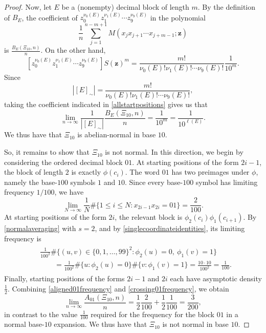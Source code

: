 \documentclass[10pt,a4paper]{amsart}
\begin{document}
\begin{proof}
 Now, let $E$ be a (nonempty) decimal block of length $m$.   By the definition of $B_E$, the coefficient of     $z_0^{\nu_0(E)}  
  z_1^{\nu_1(E)}\cdots z_9^{\nu_9(E)}$ in the polynomial   $$  \frac{1}{n}
 \sum_{j=1}^{n-m+1}M(x_jx_{j+1}\cdots x_{j+m-1};\mathbf z)
$$ is $\frac{B_E(\Xi_{10},n)}{n}$. On the other hand,
\begin{equation}\label{takecoefficient}
 \left[z_0^{\nu_0(E)}z_1^{\nu_1(E)}\cdots z_9^{\nu_9(E)}\right]
 S(\mathbf z)^m
 =\frac{m!}{\nu_0(E)!\nu_1(E)!\cdots\nu_9(E)!}\frac{1}{10^m}.
\end{equation}
Since
\begin{equation}\label{equivalenceclasssize}
 \left|[E]_{\sim}\right|
 =\frac{m!}{\nu_0(E)!\nu_1(E)!\cdots\nu_9(E)!},
\end{equation}
taking the  coefficient indicated   in \eqref{allstartpositions} gives us that  
$$
 \lim_{n\to\infty}
 \frac{1}{\left|[E]_{\sim}\right|}
 \frac{B_E(\Xi_{10},n)}{n}
 =\frac{1}{10^m}
 =\frac{1}{10^{\ell(E)}}.
$$
   We thus have that   $\Xi_{10}$ is abelian-normal in base $10$.  

 So, it remains to show that $\Xi_{10}$ is not normal. In this direction, we begin by considering the ordered decimal block $01$. At starting 
 positions of the form $2i-1$, the block of length $2$ is exactly $\phi(c_i)$. The word $01$ has two
preimages under $\phi$, namely the base-$100$ symbols $1$ and $10$.
Since every base-$100$ symbol has limiting frequency $1/100$, we have
\begin{equation}\label{aligned01frequency}
 \lim_{N\to\infty}\frac{1}{N}
 \#\{1\leq i\leq N:x_{2i-1}x_{2i}=01\}
 =\frac{2}{100}.
\end{equation}
 At starting positions of the form $2i$, the relevant block is $\phi_2(c_i)\phi_1(c_{i+1})$. By \eqref{normalaveraging} with $s=2$, and by 
 \eqref{singlecoordinateidentities}, its limiting frequency is
\begin{align}
\begin{split}
 &\frac{1}{100^2}
 \#\{(u,v)\in\{0,1,\ldots,99\}^2:
 \phi_2(u)=0,\ \phi_1(v)=1\} \\
 &\qquad=
 \frac{1}{100^2}
 \#\{u:\phi_2(u)=0\}
 \#\{v:\phi_1(v)=1\}
 =\frac{10\cdot10}{100^2}
 =\frac{1}{100}.
\end{split}\label{crossing01frequency}
\end{align}
  Finally, starting positions of the forms $2i-1$ and $2i$ each have  asymptotic density $\frac{1}{2}$.  Combining
 \eqref{aligned01frequency} and \eqref{crossing01frequency}, we obtain
$$
 \lim_{n\to\infty}\frac{A_{01}(\Xi_{10},n)}{n}
 =\frac{1}{2}\frac{2}{100}
 +\frac{1}{2}\frac{1}{100}
 =\frac{3}{200}, 
$$
 in contrast to the value $\frac{1}{100}$   required for the frequency for the
block $01$ in a normal base-$10$ expansion. We thus have that $\Xi_{10}$ is not
normal in base $10$.
\end{proof}
\end{document}
